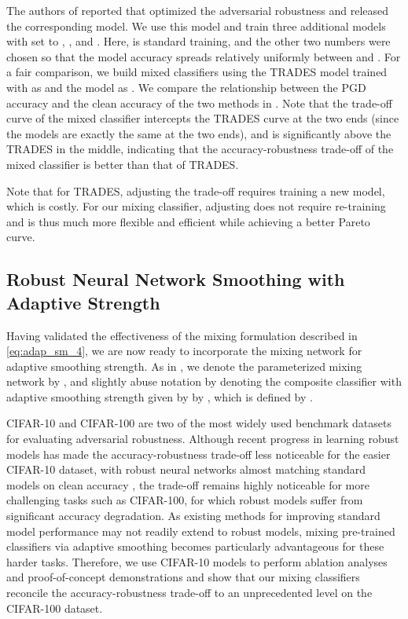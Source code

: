 \documentclass[11pt, letterpaper]{article}
\theoremstyle{plain}
\theoremstyle{definition}
\begin{document}
The authors of \citep{Zhang19} reported that  optimized the adversarial robustness and released the corresponding model. We use this model and train three additional models with  set to , , and . Here,  is standard training, and the other two numbers were chosen so that the model accuracy spreads relatively uniformly between  and . For a fair comparison, we build mixed classifiers using the TRADES model trained with  as  and the  model as . We compare the relationship between the PGD accuracy and the clean accuracy of the two methods in . Note that the trade-off curve of the mixed classifier intercepts the TRADES curve at the two ends (since the models are exactly the same at the two ends), and is significantly above the TRADES in the middle, indicating that the accuracy-robustness trade-off of the mixed classifier is better than that of TRADES.

Note that for TRADES, adjusting the trade-off requires training a new model, which is costly. For our mixing classifier, adjusting  does not require re-training and is thus much more flexible and efficient while achieving a better Pareto curve.


\subsection{Robust Neural Network Smoothing with Adaptive Strength} \label{sec:ada_exp}

Having validated the effectiveness of the mixing formulation described in \cref{eq:adap_sm_4}, we are now ready to incorporate the mixing network for adaptive smoothing strength. As in , we denote the parameterized mixing network by , and slightly abuse notation by denoting the composite classifier with adaptive smoothing strength given by  by , which is defined by .

CIFAR-10 and CIFAR-100 are two of the most widely used benchmark datasets for evaluating adversarial robustness. Although recent progress in learning robust models has made the accuracy-robustness trade-off less noticeable for the easier CIFAR-10 dataset, with robust neural networks almost matching standard models on clean accuracy \citep{Rebuffi21, Gowal20, Gowal21}, the trade-off remains highly noticeable for more challenging tasks such as CIFAR-100, for which robust models suffer from significant accuracy degradation. As existing methods for improving standard model performance may not readily extend to robust models, mixing pre-trained classifiers via adaptive smoothing becomes particularly advantageous for these harder tasks. Therefore, we use CIFAR-10 models to perform ablation analyses and proof-of-concept demonstrations and show that our mixing classifiers reconcile the accuracy-robustness trade-off to an unprecedented level on the CIFAR-100 dataset.
\end{document}
